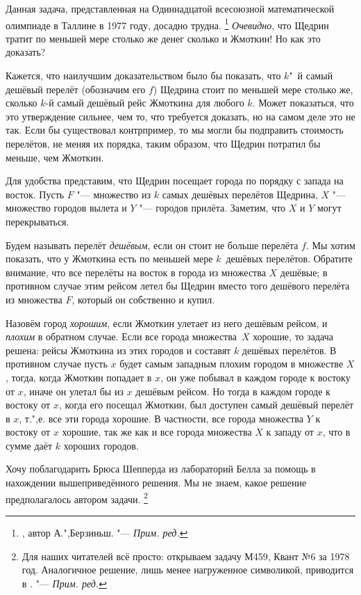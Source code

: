 \documentclass[twoside]{book}
\begin{document}
Данная задача, представленная на Одиннадцатой всесоюзной математической олимпиаде в Таллине в 1977 году, досадно трудна.%
\footnote{\cite[№240]{ВсМО}, автор  А.",Берзиньш. "--- \emph{Прим. ред.}}
\emph{Очевидно}, что Щедрин тратит по меньшей мере столько же денег сколько и Жмоткин!
Но как это доказать? %

\medskip

Кажется, что наилучшим доказательством было бы показать, что $k$"~й самый
дешёвый перелёт (обозначим его $f$) Щедрина стоит по меньшей мере столько же, сколько $k$-й самый дешёвый рейс Жмоткина для любого $k$.
Может показаться, что это утверждение сильнее, чем то, что требуется доказать, но на самом деле это не так.
Если бы существовал контрпример, то мы могли бы подправить стоимость перелётов, не меняя их порядка, таким образом, что Щедрин потратил бы меньше, чем Жмоткин.

Для удобства представим, что Щедрин посещает города по порядку с запада на восток.
Пусть $F$ "--- множество из $k$ самых дешёвых перелётов Щедрина, $X$ "--- множество городов вылета и $Y$ "--- городов прилёта.
Заметим, что $X$ и $Y$ могут перекрываться.

Будем называть перелёт \emph{дешёвым}, если он стоит не больше перелёта $f$.
Мы хотим показать, что у Жмоткина есть по меньшей мере $k$~дешёвых перелётов.
Обратите внимание, что все перелёты на восток в города из множества $X$ дешёвые; в противном случае этим рейсом летел бы Щедрин вместо того дешёвого перелёта из множества $F$, который он собственно и купил.

Назовём город \emph{хорошим}, если Жмоткин улетает из него дешёвым рейсом, и \emph{плохим} в обратном случае.
Если все города множества~$X$ хорошие, то задача решена: рейсы Жмоткина из этих городов и составят $k$ дешёвых перелётов.
В противном случае пусть $x$ будет самым западным плохим городом в множестве $X$, тогда, когда  Жмоткин попадает в $x$, он уже побывал в каждом городе к востоку от $x$, иначе он улетал бы из $x$ дешёвым рейсом.
Но тогда в каждом городе к востоку от $x$, когда его посещал Жмоткин, был доступен самый дешёвый перелёт в $x$, т.",е. все эти города хорошие.
В частности, все города множества $Y$ к востоку от $x$ хорошие, так же как и все города множества $X$ к западу от $x$, что в сумме даёт $k$ хороших городов.
\heart

Хочу поблагодарить Брюса Шепперда %
из лабораторий Белла %
за помощь в нахождении вышеприведённого решения.
Мы не знаем, какое решение предполагалось автором задачи.%
\footnote{Для наших читателей всё просто: открываем задачу М459, Квант №6 за 1978 год.
Аналогичное решение, лишь менее нагруженное символикой, приводится в \cite[№240]{ВсМО}. "--- \emph{Прим. ред.} }
\end{document}
